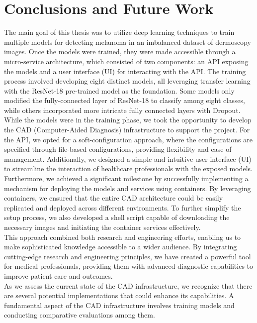 \chapter{Conclusions and Future Work}
\label{cap:concl}

The main goal of this thesis was to utilize deep learning techniques to train
multiple models for detecting melanoma in an imbalanced dataset of dermoscopy
images. Once the models were trained, they were made accessible through a
micro-service architecture, which consisted of two components: an API exposing
the models and a user interface (UI) for interacting with the API. The training
process involved developing eight distinct models, all leveraging transfer
learning with the ResNet-18 pre-trained model as the foundation. Some models
only modified the fully-connected layer of ResNet-18 to classify among eight
classes, while others incorporated more intricate fully connected layers with
Dropout. \\

While the models were in the training phase, we took the opportunity to develop
the CAD (Computer-Aided Diagnosis) infrastructure to support the project. For
the API, we opted for a soft-configuration approach, where the configurations
are specified through file-based configurations, providing flexibility and ease
of management. Additionally, we designed a simple and intuitive user interface
(UI) to streamline the interaction of healthcare professionals with the exposed
models. \\

Furthermore, we achieved a significant milestone by successfully implementing a
mechanism for deploying the models and services using containers. By leveraging
containers, we ensured that the entire CAD architecture could be easily
replicated and deployed across different environments. To further simplify the
setup process, we also developed a shell script capable of downloading the
necessary images and initiating the container services effectively. \\

This approach combined both research and engineering efforts, enabling us to
make sophisticated knowledge accessible to a wider audience. By integrating
cutting-edge research and engineering principles, we have created a powerful
tool for medical professionals, providing them with advanced diagnostic
capabilities to improve patient care and outcomes. \\

As we assess the current state of the CAD infrastructure, we recognize that
there are several potential implementations that could enhance its
capabilities. A fundamental aspect of the CAD infrastructure involves training
models and conducting comparative evaluations among them. \\

